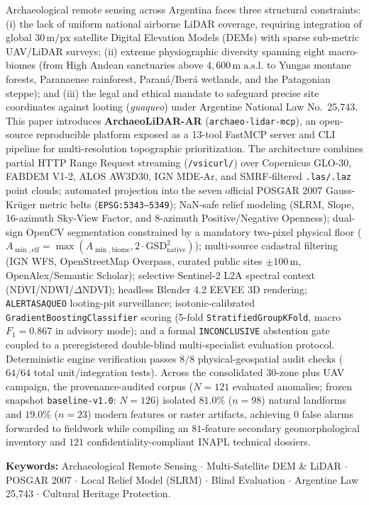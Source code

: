 \documentclass[11pt,a4paper]{article}
\DeclareRobustCommand{\_}{\ifmmode\mbox{\textunderscore}\else\textunderscore\allowbreak\fi}
\begin{document}
\begin{tcolorbox}[colback=slatebg,colframe=tealaccent!80!black,boxrule=0.6pt,arc=2pt,left=8pt,right=8pt,top=5pt,bottom=5pt]
Archaeological remote sensing across Argentina faces three structural constraints: (i) the lack of uniform national airborne LiDAR coverage, requiring integration of global $30\,\mathrm{m/px}$ satellite Digital Elevation Models (DEMs) with sparse sub-metric UAV/LiDAR surveys; (ii) extreme physiographic diversity spanning eight macro-biomes (from High Andean sanctuaries above $4,600\,\mathrm{m\;a.s.l.}$ to Yungas montane forests, Paranaense rainforest, Paran\'a/Iber\'a wetlands, and the Patagonian steppe); and (iii) the legal and ethical mandate to safeguard precise site coordinates against looting (\emph{guaqueo}) under Argentine National Law No.\ 25,743. This paper introduces \textbf{ArchaeoLiDAR-AR} (\texttt{archaeo-lidar-mcp}), an open-source reproducible platform exposed as a 13-tool FastMCP server and CLI pipeline for multi-resolution topographic prioritization. The architecture combines partial HTTP Range Request streaming (\texttt{/vsicurl/}) over Copernicus GLO-30, FABDEM V1-2, ALOS AW3D30, IGN MDE-Ar, and SMRF-filtered \texttt{.las/.laz} point clouds; automated projection into the seven official POSGAR 2007 Gauss-Kr\"uger metric belts (\texttt{EPSG:5343--5349}); NaN-safe relief modeling (SLRM, Slope, 16-azimuth Sky-View Factor, and 8-azimuth Positive/Negative Openness); dual-sign OpenCV segmentation constrained by a mandatory two-pixel physical floor ($A_{\min,\mathrm{eff}} = \max(A_{\min,\mathrm{biome}}, 2 \cdot \mathrm{GSD}_{\mathrm{native}}^2)$); multi-source cadastral filtering (IGN WFS, OpenStreetMap Overpass, curated public sites $\pm 100\,\mathrm{m}$, OpenAlex/Semantic Scholar); selective Sentinel-2 L2A spectral context (NDVI/NDWI/$\Delta\mathrm{NDVI}$); headless Blender 4.2 EEVEE 3D rendering; \texttt{ALERTA\_SAQUEO} looting-pit surveillance; isotonic-calibrated \texttt{GradientBoostingClassifier} scoring (5-fold \texttt{StratifiedGroupKFold}, macro $F_1 = 0.867$ in advisory mode); and a formal \texttt{INCONCLUSIVE} abstention gate coupled to a preregistered double-blind multi-specialist evaluation protocol. Deterministic engine verification passes $8/8$ physical-geospatial audit checks ($64/64$ total unit/integration tests). Across the consolidated 30-zone plus UAV campaign, the provenance-audited corpus ($N=121$ evaluated anomalies; frozen snapshot \texttt{baseline-v1.0}: $N=126$) isolated $81.0\%$ ($n=98$) natural landforms and $19.0\%$ ($n=23$) modern features or raster artifacts, achieving $0$ false alarms forwarded to fieldwork while compiling an $81$-feature secondary geomorphological inventory and $121$ confidentiality-compliant INAPL technical dossiers.

\vspace{4pt}
\noindent\textbf{\color{navy}Keywords:} Archaeological Remote Sensing $\cdot$ Multi-Satellite DEM \& LiDAR $\cdot$ POSGAR 2007 $\cdot$ Local Relief Model (SLRM) $\cdot$ Blind Evaluation $\cdot$ Argentine Law 25,743 $\cdot$ Cultural Heritage Protection.
\end{tcolorbox}
\end{document}
